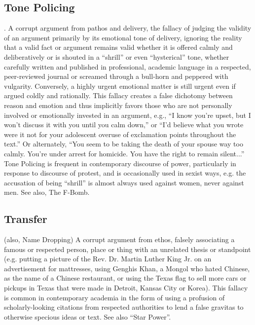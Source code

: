 \documentclass[10pt,a4paper,british]{article}
\begin{document}
\begin{multicols}{2}
	\subsection{Tone Policing}. A corrupt argument from pathos and delivery,
	the fallacy of judging the validity of an argument primarily by its
	emotional tone of delivery, ignoring the reality that a valid fact or
	argument remains valid whether it is offered calmly and deliberatively or
	is shouted in a ``shrill'' or even ``hysterical'' tone, whether carefully
	written and published in professional, academic language in a respected,
	peer{-}reviewed journal or screamed through a bull{-}horn and peppered with
	vulgarity. Conversely, a highly urgent emotional matter is still urgent
	even if argued coldly and rationally.  This fallacy creates a false
	dichotomy between reason and emotion and thus implicitly favors those who
	are not personally involved or emotionally invested in an argument, e.g.,
	``I know you're upset, but I won't discuss it with you until you calm
	down,'' or ``I'd believe what you wrote were it not for your adolescent
	overuse of exclamation points throughout the text.'' Or alternately, ``You
	seem to be taking the death of your spouse way too calmly. You're under
	arrest for homicide. You have the right to remain silent...'' Tone Policing
	is frequent in contemporary discourse of power, particularly in response to
	discourse of protest, and is occasionally used in sexist ways, e.g. the
	accusation of being ``shrill'' is almost always used against women, never
	against men. See also, The F{-}Bomb.

    \subsection{Transfer} (also, Name Dropping) A corrupt argument from ethos,
    falsely associating a famous or respected person, place or thing with an
    unrelated thesis or standpoint (e.g. putting a picture of the Rev. Dr.
    Martin Luther King Jr. on an advertisement for mattresses, using Genghis
    Khan, a Mongol who hated Chinese, as the name of a Chinese restaurant, or
    using the Texas flag to sell more cars or pickups in Texas that were made
    in Detroit, Kansas City or Korea). This fallacy is common in contemporary
    academia in the form of using a profusion of scholarly{-}looking citations
    from respected authorities to lend a false gravitas to otherwise specious
    ideas or text. See also ``Star Power''.


\end{multicols}
\end{document}
